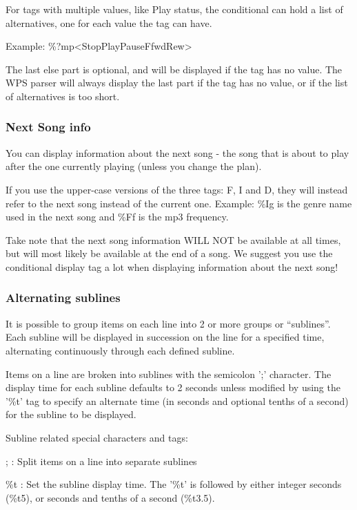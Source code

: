 For tags with multiple values, like Play status, the conditional can hold a list of alternatives, one for each value the tag can have.

Example: \%?mp{\textless}Stop{\textbar}Play{\textbar}Pause{\textbar}Ffwd{\textbar}Rew{\textgreater}

The last else part is optional, and will be displayed if the tag has no value. The WPS parser will always display the last part if the tag has no value, or if the list of alternatives is too short. 

\subsubsection{Next Song info}
You can display information about the next song {}- the song that is
about to play after the one currently playing (unless you change the
plan).

If you use the upper{}-case versions of the
three tags: F, I and D, they will instead refer to the next song
instead of the current one. Example: \%Ig is the genre name used in the
next song and \%Ff is the mp3 frequency. 

Take note that the next song information WILL NOT be available at all
times, but will most likely be available at the end of a song. We
suggest you use the conditional display tag a lot when displaying
information about the next song! 

\subsubsection{Alternating sublines}

It is possible to group items on each line into 2 or more groups or
``sublines''. Each subline will be displayed
in succession on the line for a specified time, alternating
continuously through each defined subline. 

Items on a line are broken into sublines with the semicolon
';' character. The display time for
each subline defaults to 2 seconds unless modified by using the
'\%t' tag to specify an alternate
time (in seconds and optional tenths of a second) for the subline to be
displayed. 

Subline related special characters and tags: 

;  : Split items on a line into separate sublines

\%t  : Set the subline display time. The
'\%t' is followed by either integer
seconds (\%t5), or seconds and tenths of a second (\%t3.5).

